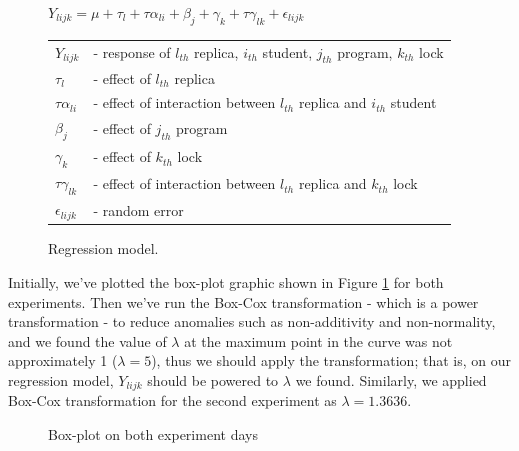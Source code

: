 \begin{figure}
\begin{center}
$Y_{lijk} = \mu + \tau_{l} + \tau\alpha_{li} + \beta_{j} + \gamma_{k} + \tau\gamma_{lk} + \epsilon_{lijk}$\\
\vspace{4mm}
\begin{tabular}{ll}
$Y_{lijk}$ & - response of $l_{th}$ replica, $i_{th}$ student, $j_{th}$ program, $k_{th}$ lock \\
$\tau_{l}$ & - effect of $l_{th}$ replica \\
$\tau\alpha_{li}$ & - effect of interaction between $l_{th}$ replica and $i_{th}$ student \\
$\beta_{j}$ & - effect of $j_{th}$ program \\
$\gamma_{k}$ & - effect of $k_{th}$ lock \\
$\tau\gamma_{lk}$ & - effect of interaction between $l_{th}$ replica and $k_{th}$ lock \\
$\epsilon_{lijk}$ & - random error \\
\end{tabular}
\caption{Regression model.}
\end{center}
\end{figure}

Initially, we've plotted the box-plot graphic shown in Figure \ref{fig:boxplot} for both experiments. Then we've run the Box-Cox transformation - which is a power transformation - to reduce anomalies such as non-additivity and non-normality, and we found the value of $\lambda$ at the maximum point in the curve was not approximately 1 ($\lambda = 5$), thus we should apply the transformation; that is, on our regression model, $Y_{lijk}$ should be powered to $\lambda$ we found. Similarly, we applied Box-Cox transformation for the second experiment as $\lambda = 1.3636$.

\begin{figure}%
    \centering
    \qquad
    \caption{Box-plot on both experiment days}%
    \label{fig:boxplot}%
\end{figure}

